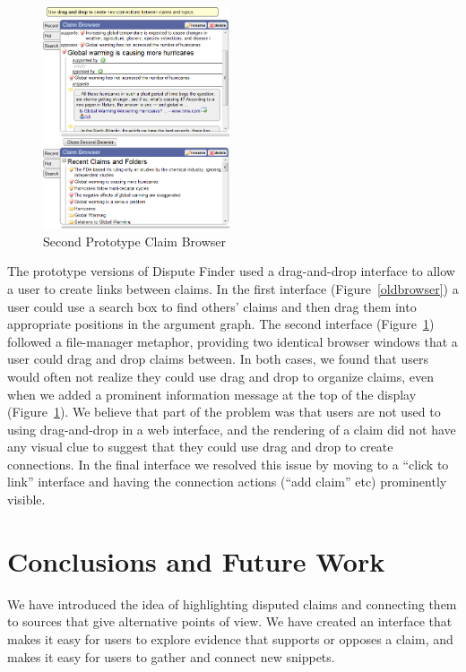 \documentclass{www2010-submission}
\begin{document}
\begin{figure}[tb]
\begin{center}
	\includegraphics[width=5.5cm]{../screenshots/claimbrowse.png}
	\caption{Second Prototype Claim Browser}
	\label{secondbrowser}
\end{center}
\end{figure}

The prototype versions of Dispute Finder used a drag-and-drop interface to allow a user to create links between claims. In the first interface (Figure~\ref{oldbrowser}) a user could use a search box to find others' claims and then drag them into appropriate positions in the argument graph. The second interface (Figure~\ref{secondbrowser}) followed a file-manager metaphor, providing two identical browser windows that a user could drag and drop claims between. 
In both cases, we found that users would often not realize they could use drag and drop to organize claims, even when we added a prominent information message at the top of the display (Figure~\ref{secondbrowser}). We believe that part of the problem was that users are not used to using drag-and-drop in a web interface, and the rendering of a claim did not have any visual clue to suggest that they could use drag and drop to create connections. In the final interface we resolved this issue by moving to a ``click to link'' interface and having the connection actions (``add claim'' etc) prominently visible.

\section{Conclusions and Future Work}

We have introduced the idea of highlighting disputed claims and connecting them to sources that give alternative points of view. We have created an interface that makes it easy for users to explore evidence that supports or opposes a claim, and makes it easy for users to gather and connect new snippets. 
\end{document}
